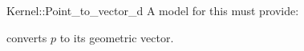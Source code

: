 \begin{ccRefFunctionObjectConcept}{Kernel::Point_to_vector_d}
A model for this must provide:


{converts $p$ to its geometric vector.}

\end{ccRefFunctionObjectConcept}
